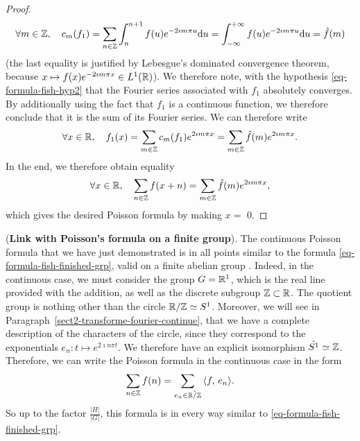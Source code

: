 \begin{proof}
\begin{equation*}
\forall m \in \mathbb{Z}, \quad c_m (f_1) = \sum_{n \in \mathbb{Z}}{\int_{n}^{n + 1}{f(u) e^{- 2 \imath m \pi u}} \mathrm{d} u} = \int_{-\infty}^{+\infty}{f(u) e^{- 2 \imath m \pi u} \mathrm{d} u} = \hat{f} (m)
\end{equation*}
(the last equality is justified by Lebesgue's dominated convergence theorem, because $ x \mapsto f(x) e^{- 2 \imath m \pi x} \in L^1 (\mathbb{R}) $). We therefore note, with the hypothesis \eqref{eq-formula-fish-hyp2} that the Fourier series associated with $ f_1 $ absolutely converges. By additionally using the fact that $ f_1 $ is a continuous function, we therefore conclude that it is the sum of its Fourier series. We can therefore write
\begin{equation*}
\forall x \in \mathbb{R}, \quad f_1 (x) = \sum_{m \in \mathbb{Z}}{c_m (f_1) e^{2 \imath m \pi x}} = \sum_{m \in \mathbb{Z} }{\hat{f} (m) e^{2 \imath m \pi x}}.
\end{equation*}
In the end, we therefore obtain equality
\begin{equation*}
\forall x \in \mathbb{R}, \quad \sum_{n \in \mathbb{Z}}{f(x + n)} = \sum_{m \in \mathbb{Z}}{\hat{f} (m) e^{2 \imath m \pi x}},
\end{equation*}
which gives the desired Poisson formula by making $ x = $ 0.
\end{proof}
 
 
\begin{rem}{(\upshape \textbf{Link with Poisson's formula on a finite group}).} 
  The continuous Poisson formula that we have just demonstrated is in all points similar to the formula \eqref{eq-formula-fish-finished-grp}, valid on a finite abelian group . Indeed, in the continuous case, we must consider the group $ G = \mathbb{R}^1 $, which is the real line provided with the addition, as well as the discrete subgroup $ \mathbb{Z} \subset \mathbb{R} $. The quotient group is nothing other than the circle $ \mathbb{R} / \mathbb{Z} \simeq S^1 $. Moreover, we will see in Paragraph~\ref{sect2-transforme-fourier-continue}, that we have a complete description of the characters of the circle, since they correspond to the exponentials $ e_n: t \mapsto e^{2 \imath n \pi t} $. We therefore have an explicit isomorphism $ \hat{S^1} \simeq \mathbb{Z} $. Therefore, we can write the Poisson formula in the continuous case in the form
\begin{equation*}
\sum_{n \in \mathbb{Z}}{f(n)} = \sum_{e_n \in \hat{\mathbb{R} / \mathbb{Z}}}{\langle f,\,e_n\rangle}.
\end{equation*}
So up to the factor $ \frac{| H |}{|G|} $, this formula is in every way similar to \eqref{eq-formula-fish-finished-grp}.
\end{rem}
 
